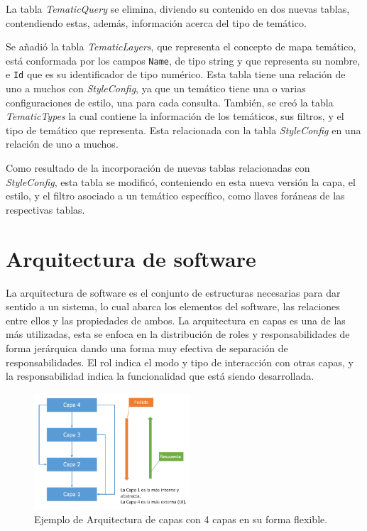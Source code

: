 La tabla \textit{TematicQuery} se elimina, diviendo su contenido en dos nuevas tablas, contendiendo estas, adem\'as, informaci\'on acerca del tipo de tem\'atico.

Se a\~nadi\'o la tabla \textit{TematicLayers}, que representa el concepto de mapa tem\'atico, est\'a conformada por los campos \texttt{Name}, de tipo string y que representa su nombre, e \texttt{Id} que es su identificador de tipo num\'erico. Esta tabla tiene una relaci\'on de uno a muchos con \textit{StyleConfig}, ya que un tem\'atico tiene una o varias configuraciones de estilo, una para cada consulta. Tambi\'en, se cre\'o la tabla \textit{TematicTypes} la cual contiene la informaci\'on de los tem\'aticos, sus filtros, y el tipo de tem\'atico que representa. Esta relacionada con la tabla \textit{StyleConfig} en una relaci\'on de uno a muchos.

Como resultado de la incorporaci\'on de nuevas tablas relacionadas con \textit{StyleConfig}, esta tabla se modific\'o, conteniendo en esta nueva versi\'on la capa, el estilo, y el filtro asociado a un tem\'atico espec\'ifico, como llaves for\'aneas de las respectivas tablas.


\section{Arquitectura de software}
La arquitectura de software es el conjunto de estructuras necesarias para dar sentido a un sistema, lo cual abarca los elementos del software, las relaciones entre ellos y las propiedades de ambos. La arquitectura en capas es una de las m\'as utilizadas, esta se enfoca en la distribuci\'on de roles y responsabilidades de forma jer\'arquica dando una forma muy efectiva de separaci\'on de responsabilidades. El rol indica el modo y tipo de interacci\'on con otras capas, y la responsabilidad indica la funcionalidad que est\'a siendo desarrollada. \cite{architecture2}

\begin{figure} 
\vspace{-20pt} 
\begin{center} 
\includegraphics[width=0.52\textwidth]{images/arquitecturaFlexible.png} 
\end{center} \vspace{-20pt} \caption{Ejemplo de Arquitectura de capas con 4 capas en su forma flexible.} \label{flexible} \vspace{-10pt} 
\end{figure}

